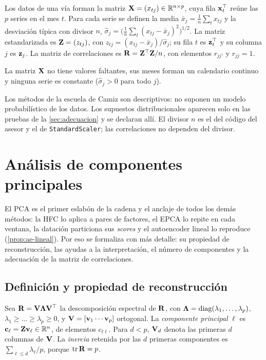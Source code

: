 \begin{definicion}\label{def:datos}
Los datos de una vía forman la matriz $\mathbf{X}=(x_{tj})\in\mathbb{R}^{n\times p}$, cuya fila
$\mathbf{x}_t^{\top}$ reúne las $p$ series en el mes $t$. Para cada serie se definen la media
$\bar x_j=\frac1n\sum_{t}x_{tj}$ y la desviación típica con divisor $n$,
$\hat\sigma_j=\bigl(\frac1n\sum_t(x_{tj}-\bar x_j)^2\bigr)^{1/2}$. La matriz estandarizada es
$\mathbf{Z}=(z_{tj})$, con $z_{tj}=(x_{tj}-\bar x_j)/\hat\sigma_j$; su fila $t$ es $\mathbf{z}_t^{\top}$ y su
columna $j$ es $\mathbf{z}_j$. La matriz de correlaciones es $\mathbf{R}=\mathbf{Z}^{\top}\mathbf{Z}/n$, con elementos
$r_{jj'}$ y $r_{jj}=1$.
\end{definicion}

\begin{supuesto}\label{sup:datos}
La matriz $\mathbf{X}$ no tiene valores faltantes, sus meses forman un calendario continuo y ninguna
serie es constante ($\hat\sigma_j>0$ para todo $j$).
\end{supuesto}

Los métodos de la escuela de Camiz son descriptivos: no suponen un modelo probabilístico de los
datos. Los supuestos distribucionales aparecen solo en las pruebas de la
\cref{sec:adecuacion} y se declaran allí. El divisor $n$ es el del código del asesor y el de
\texttt{StandardScaler}; las correlaciones no dependen del divisor.

\section{Análisis de componentes principales}
\label{sec:pca}

El PCA es el primer eslabón de la cadena y el anclaje de todos los demás métodos: la HFC lo aplica
a pares de factores, el EPCA lo repite en cada ventana, la datación particiona sus
\emph{scores} y el autoencoder lineal lo reproduce (\cref{prop:ae-lineal}). Por eso se formaliza
con más detalle: su propiedad de reconstrucción, las ayudas a la interpretación, el número de
componentes y la adecuación de la matriz de correlaciones.

\subsection{Definición y propiedad de reconstrucción}

\begin{definicion}\label{def:pca}
Sea $\mathbf{R}=\mathbf{V}\boldsymbol{\Lambda}\mathbf{V}^{\top}$ la descomposición espectral de $\mathbf{R}$, con
$\boldsymbol{\Lambda}=\operatorname{diag}(\lambda_1,\dots,\lambda_p)$, $\lambda_1\ge\dots\ge\lambda_p\ge0$, y
$\mathbf{V}=[\mathbf{v}_1\cdots\mathbf{v}_p]$ ortogonal. La \emph{componente principal} $\ell$ es
$\mathbf{c}_\ell=\mathbf{Z}\mathbf{v}_\ell\in\mathbb{R}^{n}$, de elementos $c_{t\ell}$. Para $d<p$, $\mathbf{V}_d$ denota las
primeras $d$ columnas de $\mathbf{V}$. La \emph{inercia} retenida por las $d$ primeras componentes es
$\sum_{\ell\le d}\lambda_\ell/p$, porque $\operatorname{tr}\mathbf{R}=p$.
\end{definicion}


